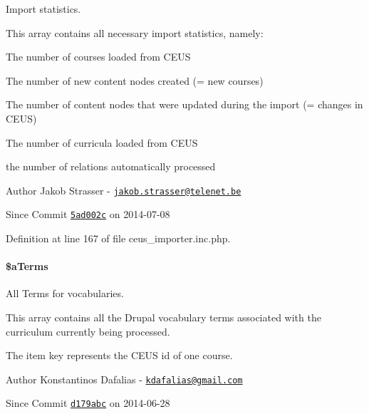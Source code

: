 Import statistics. 

This array contains all necessary import statistics, namely\+:
\begin{DoxyItemize}
\item The number of courses loaded from C\+E\+U\+S
\item The number of new content nodes created (= new courses)
\item The number of content nodes that were updated during the import (= changes in C\+E\+U\+S)
\item The number of curricula loaded from C\+E\+U\+S
\item the number of relations automatically processed
\end{DoxyItemize}

\begin{DoxyAuthor}{Author}
Jakob Strasser -\/ \href{mailto:jakob.strasser@telenet.be}{\tt jakob.\+strasser@telenet.\+be} 
\end{DoxyAuthor}
\begin{DoxySince}{Since}
Commit \href{http://github.com/TheJake123/DrupalModul/commit/5ad002c8e7a233bc25ac0e1dcf2b9f62520281c1}{\tt 5ad002c} on 2014-\/07-\/08 
\end{DoxySince}


Definition at line 167 of file ceus\+\_\+importer.\+inc.\+php.

\hypertarget{classceus__importer_a504ee22f4791f6d41ebe97c5786ee547}{
\paragraph[{\$a\+Terms}]{\setlength{\rightskip}{0pt plus 5cm}\$a\+Terms\hspace{0.3cm}{\ttfamily [private]}}}\label{classceus__importer_a504ee22f4791f6d41ebe97c5786ee547}


All Terms for vocabularies. 

This array contains all the Drupal vocabulary terms associated with the curriculum currently being processed.

The item key represents the C\+E\+U\+S id of one course.

\begin{DoxyAuthor}{Author}
Konstantinos Dafalias -\/ \href{mailto:kdafalias@gmail.com}{\tt kdafalias@gmail.\+com} 
\end{DoxyAuthor}
\begin{DoxySince}{Since}
Commit \href{http://github.com/TheJake123/DrupalModul/commit/d179abcc5e05743086cd67cf1ce30b08923a7183}{\tt d179abc} on 2014-\/06-\/28 
\end{DoxySince}


